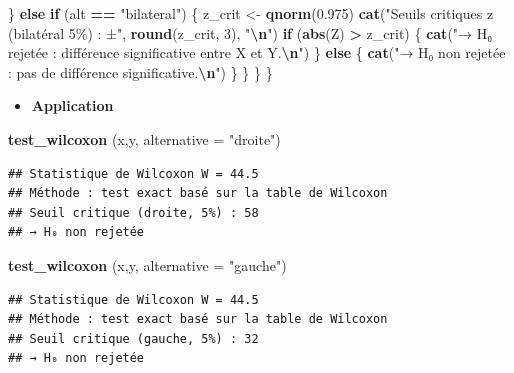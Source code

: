 \documentclass[
  12pt,
]{article}
\newenvironment{Shaded}{\begin{snugshade}}{\end{snugshade}}
\newcommand{\AttributeTok}[1]{\textcolor[rgb]{0.13,0.29,0.53}{#1}}
\newcommand{\ControlFlowTok}[1]{\textcolor[rgb]{0.13,0.29,0.53}{\textbf{#1}}}
\newcommand{\DecValTok}[1]{\textcolor[rgb]{0.00,0.00,0.81}{#1}}
\newcommand{\FloatTok}[1]{\textcolor[rgb]{0.00,0.00,0.81}{#1}}
\newcommand{\FunctionTok}[1]{\textcolor[rgb]{0.13,0.29,0.53}{\textbf{#1}}}
\newcommand{\NormalTok}[1]{#1}
\newcommand{\OtherTok}[1]{\textcolor[rgb]{0.56,0.35,0.01}{#1}}
\newcommand{\SpecialCharTok}[1]{\textcolor[rgb]{0.81,0.36,0.00}{\textbf{#1}}}
\newcommand{\StringTok}[1]{\textcolor[rgb]{0.31,0.60,0.02}{#1}}
\providecommand{\tightlist}{%
  \setlength{\itemsep}{0pt}\setlength{\parskip}{0pt}}
\begin{document}
\begin{Shaded}
\begin{Highlighting}[]
\NormalTok{    \} }\ControlFlowTok{else} \ControlFlowTok{if}\NormalTok{ (alt }\SpecialCharTok{==} \StringTok{"bilateral"}\NormalTok{) \{}
\NormalTok{      z\_crit }\OtherTok{\textless{}{-}} \FunctionTok{qnorm}\NormalTok{(}\FloatTok{0.975}\NormalTok{)}
      \FunctionTok{cat}\NormalTok{(}\StringTok{"Seuils critiques z (bilatéral 5\%) : ±"}\NormalTok{, }\FunctionTok{round}\NormalTok{(z\_crit, }\DecValTok{3}\NormalTok{), }\StringTok{"}\SpecialCharTok{\textbackslash{}n}\StringTok{"}\NormalTok{)}
      \ControlFlowTok{if}\NormalTok{ (}\FunctionTok{abs}\NormalTok{(Z) }\SpecialCharTok{\textgreater{}}\NormalTok{ z\_crit) \{}
        \FunctionTok{cat}\NormalTok{(}\StringTok{"→ H₀ rejetée : différence significative entre X et Y.}\SpecialCharTok{\textbackslash{}n}\StringTok{"}\NormalTok{)}
\NormalTok{      \} }\ControlFlowTok{else}\NormalTok{ \{}
        \FunctionTok{cat}\NormalTok{(}\StringTok{"→ H₀ non rejetée : pas de différence significative.}\SpecialCharTok{\textbackslash{}n}\StringTok{"}\NormalTok{)}
\NormalTok{      \}}
\NormalTok{    \}}
\NormalTok{  \}}
\NormalTok{\}}
\end{Highlighting}
\end{Shaded}

\begin{itemize}
\tightlist
\item
  \textbf{Application}
\end{itemize}

\begin{Shaded}
\begin{Highlighting}[]
\FunctionTok{test\_wilcoxon}\NormalTok{ (x,y, }\AttributeTok{alternative =} \StringTok{"droite"}\NormalTok{)}
\end{Highlighting}
\end{Shaded}

\begin{verbatim}
## Statistique de Wilcoxon W = 44.5 
## Méthode : test exact basé sur la table de Wilcoxon
## Seuil critique (droite, 5%) : 58 
## → H₀ non rejetée
\end{verbatim}

\begin{Shaded}
\begin{Highlighting}[]
\FunctionTok{test\_wilcoxon}\NormalTok{ (x,y, }\AttributeTok{alternative =} \StringTok{"gauche"}\NormalTok{)}
\end{Highlighting}
\end{Shaded}

\begin{verbatim}
## Statistique de Wilcoxon W = 44.5 
## Méthode : test exact basé sur la table de Wilcoxon
## Seuil critique (gauche, 5%) : 32 
## → H₀ non rejetée
\end{verbatim}
\end{document}
